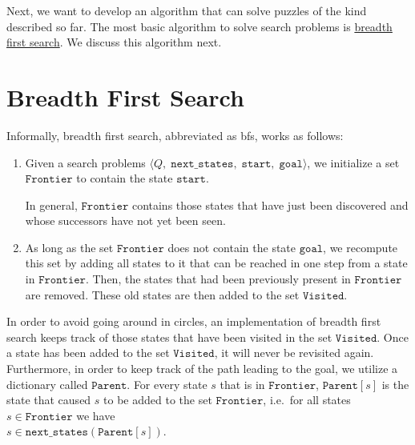 Next, we want to develop an algorithm that can solve puzzles of the kind described so far.  The most basic
algorithm to solve search problems is \href{https://en.wikipedia.org/wiki/Breadth-first_search}{breadth first search}.
We discuss this algorithm next.

\section{Breadth First Search}
Informally, breadth first search, abbreviated as \ac{bfs}, works as follows: 
\begin{enumerate}
\item Given a search problems $\langle Q,\;\mathtt{next\_states},\; \mathtt{start},\; \mathtt{goal}\rangle$,
      we initialize a set $\texttt{Frontier}$ to contain the state $\texttt{start}$.

      In general, $\texttt{Frontier}$ contains those states that have just been discovered and whose successors have not
      yet been seen.
\item As long as the set $\texttt{Frontier}$ does not contain the state $\texttt{goal}$, we recompute this set
      by adding all states to it that can be reached in one step from a state in $\texttt{Frontier}$.
      Then, the states that had been previously present in $\texttt{Frontier}$ are removed.
      These old states are then added to the set $\texttt{Visited}$.
\end{enumerate}
In order to avoid going around in circles, an implementation of breadth first search keeps track of those
states that have been visited in the set $\texttt{Visited}$.  Once a state has been added to
the set $\texttt{Visited}$,  it will never be revisited again.
Furthermore, in order to keep track of the path leading to the goal, we utilize a dictionary called
$\texttt{Parent}$.  For every state $s$ that is in $\texttt{Frontier}$, $\mathtt{Parent}[s]$ is the state that
caused $s$ to be added to the set $\texttt{Frontier}$, i.e.~for all states $s\in\mathtt{Frontier}$ 
we have 
\\[0.2cm]
\hspace*{1.3cm}
$s \in \mathtt{next\_states}(\mathtt{Parent}[s])$.


